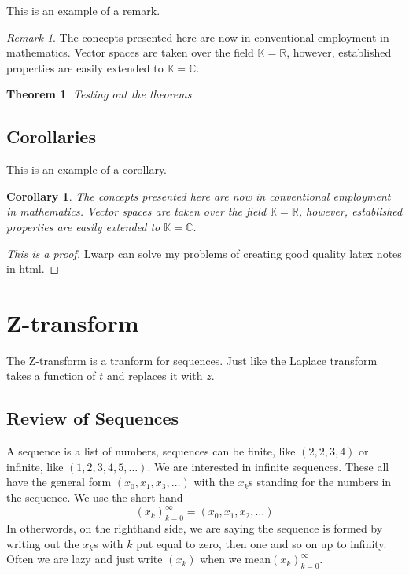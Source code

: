 \documentclass{scrreprt}
\theoremstyle{plain}
\newtheorem{theorem}{Theorem}[section]
\newtheorem{corollary}{Corollary}[theorem]
\theoremstyle{definition}
\theoremstyle{remark}
\newtheorem*{remark}{Remark}
\begin{document}
This is an example of a remark.

\begin{remark}
	The concepts presented here are now in conventional employment in mathematics. Vector spaces are taken over the field $\mathbb{K}=\mathbb{R}$, however, established properties are easily extended to $\mathbb{K}=\mathbb{C}$.
\end{remark}

\begin{theorem}
	Testing out the theorems
\end{theorem}

\section{Corollaries}

This is an example of a corollary.

\begin{corollary}
	The concepts presented here are now in conventional employment in mathematics. Vector spaces are taken over the field $\mathbb{K}=\mathbb{R}$, however, established properties are easily extended to $\mathbb{K}=\mathbb{C}$.
\end{corollary}

%
%


\begin{proof}[This is a proof]
	Lwarp can solve my problems of creating good quality latex notes in html.
\end{proof}


\chapter{Z-transform}
The Z-transform is a tranform for sequences. Just like the Laplace
transform takes a function of $t$ and replaces it with $z$.

\section{Review of Sequences}
A sequence is a list of numbers, sequences can be finite, like
$(2,2,3,4)$ or infinite, like $(1,2,3,4,5,\ldots)$. We are interested
in infinite sequences. These all have the general 
form $(x_0,x_1,x_3,\ldots)$ with the $x_k$s standing for the numbers in the sequence. We use the short hand
\begin{equation}
(x_k)_{k=0}^\infty=(x_0,x_1,x_2,\ldots)
\end{equation}
In otherwords, on the righthand side, we are saying the sequence is
formed by writing out the $x_k$s with $k$ put equal to zero, then one
and so on up to infinity. Often we are lazy and just write $(x_k)$ when we mean$(x_k)_{k=0}^\infty$. 
\end{document}
